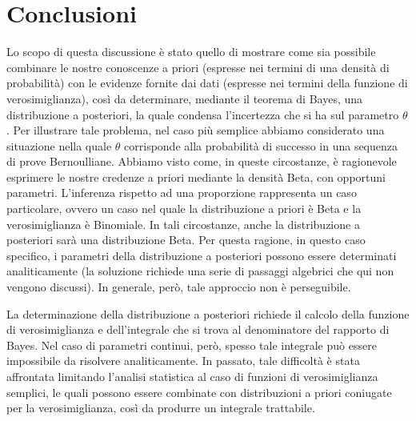 \section*{Conclusioni}
\label{sec:pregi_inferenza_bayes}


Lo scopo di questa discussione è stato quello di mostrare come sia possibile combinare le nostre conoscenze a priori (espresse nei termini di una densità di probabilità) con le evidenze fornite dai dati (espresse nei termini della funzione di verosimiglianza), così da determinare, mediante il teorema di Bayes, una distribuzione a posteriori, la quale condensa l'incertezza che si ha sul parametro $\theta$. 
Per illustrare tale problema, nel caso più semplice abbiamo considerato una situazione nella quale $\theta$ corrisponde alla probabilità di successo in una sequenza di prove Bernoulliane. 
Abbiamo visto come, in queste circostanze, è ragionevole esprimere le nostre credenze a priori mediante la densità Beta, con opportuni parametri. 
L'inferenza rispetto ad una proporzione rappresenta un caso particolare, ovvero un caso nel quale la distribuzione a priori è Beta e la verosimiglianza è Binomiale. 
In tali circostanze, anche la distribuzione a posteriori sarà una distribuzione Beta. 
Per questa ragione, in questo caso specifico, i parametri della distribuzione a posteriori possono essere determinati analiticamente (la soluzione richiede una serie di passaggi algebrici che qui non vengono discussi). 
In generale, però, tale approccio non è perseguibile.

La determinazione della distribuzione a posteriori richiede il calcolo della funzione di verosimiglianza e dell'integrale che si trova al denominatore del rapporto di Bayes. 
Nel caso di parametri continui, però, spesso tale integrale può essere impossibile da risolvere analiticamente. 
In passato, tale difficoltà è stata affrontata limitando l'analisi statistica al caso di funzioni di verosimiglianza semplici, le quali possono essere combinate con distribuzioni a priori coniugate per la verosimiglianza, così da produrre un integrale trattabile. 

